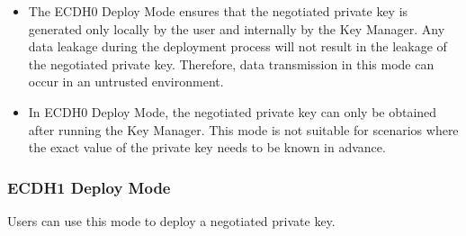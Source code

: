 \documentclass[main\_\_EN.tex]{subfiles}
\begin{document}
\vspace{-0.5em}
\begin{tiplisting}
\vspace{-2em}
\begin{itemize}
    \item The ECDH0 Deploy Mode ensures that the negotiated private key is generated only locally by the user and internally by the Key Manager. Any data leakage during the deployment process will not result in the leakage of the negotiated private key. Therefore, data transmission in this mode can occur in an untrusted environment.
    \item In ECDH0 Deploy Mode, the negotiated private key can only be obtained after running the Key Manager. This mode is not suitable for scenarios where the exact value of the private key needs to be known in advance.
\end{itemize}
\end{tiplisting}

\subsubsection{ECDH1 Deploy Mode}

Users can use this mode to deploy a negotiated private key.
\end{document}
